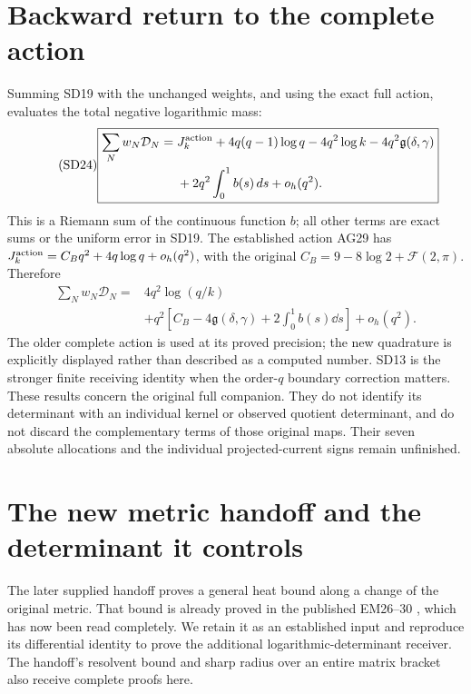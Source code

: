 \documentclass[11pt]{article}
\begin{document}
\section{Backward return to the complete action}
Summing SD19 with the unchanged weights, and using the exact full
action, evaluates the total negative logarithmic mass:
\begin{equation}\tag{SD24}
\boxed{\begin{aligned}
\sum_Nw_N\mathcal D_N={}&J_k^{\rm action}
+4q(q-1)\log q-4q^2\log k-4q^2\mathfrak g(\delta,\gamma)\\
&+2q^2\int_0^1 b(s)\,d s+o_h(q^2).
\end{aligned}}
\end{equation}
This is a Riemann sum of the continuous function $b$; all other terms
are exact sums or the uniform error in SD19. The established action
AG29 \cite{AG} has $J_k^{\rm action}=C_Bq^2+4q\log q+o_h(q^2)$,
with the original $C_B=9-8\log2+\mathcal F(2,\pi)$. Therefore
\begin{equation}\tag{SD25}
\boxed{\begin{aligned}
\sum_Nw_N\mathcal D_N={}&4q^2\log(q/k)\\
&+q^2\left[C_B-4\mathfrak g(\delta,\gamma)
+2\int_0^1b(s)\dd s\right]+o_h(q^2).
\end{aligned}}
\end{equation}
The older complete action is used at its proved precision; the new
quadrature is explicitly displayed rather than described as a computed
number. SD13 is the stronger finite receiving identity when the
order-$q$ boundary correction matters. These results concern the
original full companion. They do not identify its determinant with an
individual kernel or observed quotient determinant, and do not discard
the complementary terms of those original maps. Their seven absolute
allocations and the individual projected-current signs remain unfinished.

\section{The new metric handoff and the determinant it controls}
The later supplied handoff \cite[Section 1]{metricintake} proves a
general heat bound along a change of the original metric. That bound is
already proved in the published EM26--30 \cite{EM}, which has now been
read completely. We retain it as an established input and reproduce its
differential identity to prove the additional logarithmic-determinant
receiver. The handoff's resolvent bound and sharp radius over an entire
matrix bracket also receive complete proofs here.
\end{document}
